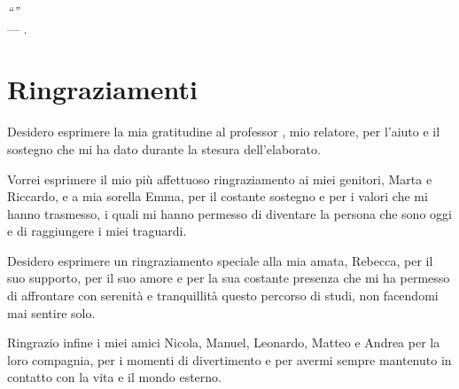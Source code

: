 \cleardoublepage
{}
{}

\begin{flushright}{
        \slshape
        ``''} \\
    \medskip
    --- .
\end{flushright}

\begingroup
\let\clearpage\relax
\let\cleardoublepage\relax
\let\cleardoublepage\relax

\chapter*{Ringraziamenti}

\noindent Desidero esprimere la mia gratitudine al professor \myProf, mio relatore, per l'aiuto e il sostegno che mi ha dato durante la stesura dell'elaborato.

\vspace{0.35cm}

\noindent Vorrei esprimere il mio più affettuoso ringraziamento ai miei genitori, Marta e Riccardo, e a mia sorella Emma, per il costante sostegno e
per i valori che mi hanno trasmesso, i quali mi hanno permesso di diventare la persona che sono oggi e di raggiungere i miei traguardi.

\vspace{0.35cm}

\noindent Desidero esprimere un ringraziamento speciale alla mia amata, Rebecca, per il suo supporto, per il suo amore e per la sua costante presenza che mi ha permesso di
affrontare con serenità e tranquillità questo percorso di studi, non facendomi mai sentire solo.

\vspace{0.35cm}

\noindent Ringrazio infine i miei amici Nicola, Manuel, Leonardo, Matteo e Andrea per la loro compagnia, per i momenti di divertimento e per avermi sempre mantenuto in
contatto con la vita e il mondo esterno.

\vspace{0.75cm}

\noindent{\myLocation, \myTime}
\hfill \textit{\myName}

\endgroup

